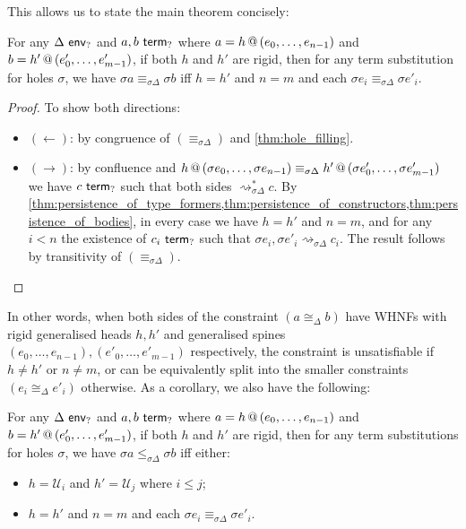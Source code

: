 \documentclass[twoside]{report}
\begin{document}
This allows us to state the main theorem concisely:

\begin{proposition}
\label{thm:rigid_rigid_matching}
For any $\Delta \ \mathsf{env}_{?}$ and $a, b \ \mathsf{term}_{?}$ where $a = {h}\,@\,({e_0, \ldots, e_{n-1}})$ and $b = {h'}\,@\,({e'_0, \ldots, e'_{m-1}})$, if both $h$ and $h'$ are rigid, then for any term substitution for holes $\sigma$, we have $\sigma a \equiv_{\sigma \Delta} \sigma b$ iff $h = h'$ and $n = m$ and each $\sigma {e_i} \equiv_{\sigma \Delta} \sigma {e'_i}$.
\end{proposition}

\begin{proof}
To show both directions:
\begin{itemize}[noitemsep]
    \item $(\leftarrow)$: by congruence of $(\equiv_{\sigma \Delta})$ and \cref{thm:hole_filling}.
    \item $(\rightarrow)$: by confluence and ${h}\,@\,({\sigma {e_0}, \ldots, \sigma {e_{n-1}}}) \equiv_{\sigma \Delta} {h'}\,@\,({\sigma {e'_0}, \ldots, \sigma {e'_{m-1}}})$ we have $c \ \mathsf{term}_{?}$ such that both sides $\rightsquigarrow_{\sigma \Delta}^\ast c$. By \cref{thm:persistence_of_type_formers,thm:persistence_of_constructors,thm:persistence_of_bodies}, in every case we have $h = h'$ and $n = m$, and for any $i < n$ the existence of $c_i \ \mathsf{term}_{?}$ such that $\sigma {e_i}, \sigma {e'_i} \rightsquigarrow_{\sigma \Delta} c_i$. The result follows by transitivity of $(\equiv_{\sigma \Delta})$. \qedhere
\end{itemize}
\end{proof}

In other words, when both sides of the constraint $(a \cong_\Delta b)$ have WHNFs with rigid generalised heads $h, h'$ and generalised spines $(e_0, \ldots, e_{n-1}), (e'_0, \ldots, e'_{m-1})$ respectively, the constraint is unsatisfiable if $h \neq h'$ or $n \neq m$, or can be equivalently split into the smaller constraints $(e_i \cong_\Delta e'_i)$ otherwise. As a corollary, we also have the following:

\begin{proposition}
\label{thm:rigid_rigid_subtype_matching}
For any $\Delta \ \mathsf{env}_{?}$ and $a, b \ \mathsf{term}_{?}$ where $a = {h}\,@\,({e_0, \ldots, e_{n-1}})$ and $b = {h'}\,@\,({e'_0, \ldots, e'_{m-1}})$, if both $h$ and $h'$ are rigid, then for any term substitutions for holes $\sigma$, we have $\sigma a \leq_{\sigma \Delta} \sigma b$ iff either:
\begin{itemize}[noitemsep]
    \item $h = \mathcal U_i$ and $h' = \mathcal U_j$ where $i \leq j$;
    \item $h = h'$ and $n = m$ and each $\sigma {e_i} \equiv_{\sigma \Delta} \sigma {e'_i}$.
\end{itemize}
\end{proposition}
\end{document}
